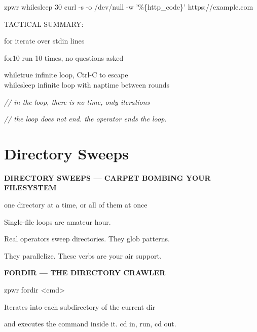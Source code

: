 \documentclass[11pt,a4paper,twoside]{book}
\begin{document}
\begin{codebox}
zpwr whilesleep 30 curl -s -o /dev/null -w '\%\{http\_code\}' https://example.com\\
\end{codebox}

TACTICAL SUMMARY:

for          iterate over stdin lines

for10        run 10 times, no questions asked

\begin{codebox}
whiletrue    infinite loop, Ctrl-C to escape\\
whilesleep   infinite loop with naptime between rounds\\
\end{codebox}

{\small\itshape\color{dimtext} // in the loop, there is no time, only iterations}

{\small\itshape\color{dimtext} // the loop does not end. the operator ends the loop.}


\vspace{16pt}

\section{Directory Sweeps}


\vspace{10pt}
{\large\bfseries\color{neoncyan} DIRECTORY SWEEPS — CARPET BOMBING YOUR FILESYSTEM}\vspace{6pt}

one directory at a time, or all of them at once

Single-file loops are amateur hour.

Real operators sweep directories. They glob patterns.

They parallelize. These verbs are your air support.


\vspace{12pt}
{\bfseries\color{neonyellow} FORDIR — THE DIRECTORY CRAWLER}\vspace{4pt}

\begin{codebox}
zpwr fordir <cmd>\\
\end{codebox}

Iterates into each subdirectory of the current dir

and executes the command inside it. cd in, run, cd out.
\end{document}
